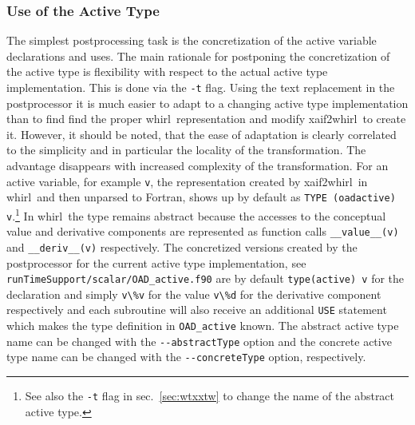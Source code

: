 \documentclass{book}
\newcommand{\whirl}{whirl}
\newcommand{\xaifTowhirl}{xaif2whirl}
\newcommand{\refsec}[1]{{sec.~\ref{#1}}}
\begin{document}
\subsubsection{Use of the Active Type}\label{sec:activeType}
The simplest postprocessing task is the concretization of the active variable declarations 
and uses. The main rationale for postponing the concretization of the active type is flexibility 
with respect to the actual active type implementation.
This is done via the \lstinline{-t} flag. 
Using the text replacement in the  postprocessor 
it is much easier to adapt to a changing active type implementation than to 
find find the proper \whirl\ representation and modify \xaifTowhirl\ to create it.
However, it should be noted, that the ease of adaptation is clearly correlated to the 
simplicity and in particular the locality of the transformation. The advantage disappears with 
increased complexity of the transformation.   
For an active variable, for example  \lstinline{v},  the representation created 
by \xaifTowhirl\ in \whirl\ and then unparsed to Fortran,
shows up by default as \lstinline{TYPE (oadactive) v}.\footnote{See also the \lstinline{-t} flag 
in \refsec{sec:wtxxtw} to change the name of the abstract active type.} 
In \whirl\ the type remains abstract because the accesses to the conceptual value and derivative components 
are represented as function calls \lstinline{__value__(v)} and \lstinline{__deriv__(v)} respectively.
The concretized versions created by the postprocessor for the current active type implementation, 
see \lstinline{runTimeSupport/scalar/OAD_active.f90} are by default 
\lstinline{type(active) v} for the declaration and simply \lstinline{v\%v} for the value \lstinline{v\%d} for 
the derivative component respectively and each subroutine will also receive an additional 
\lstinline{USE} statement which makes the type definition in \lstinline{OAD_active} known.
The abstract active type  name can be changed with the \lstinline{--abstractType} option and 
the concrete active type name  can be changed with the \lstinline{--concreteType} option, respectively.
\end{document}
